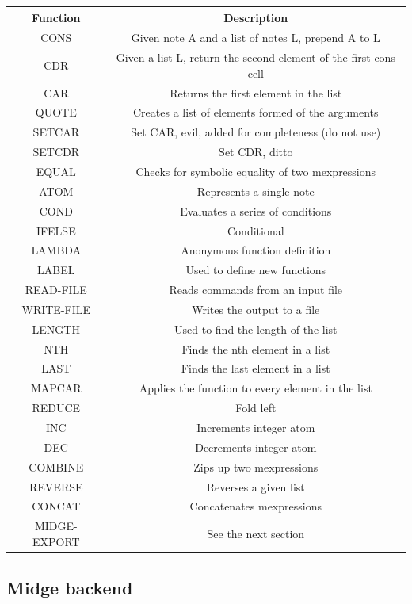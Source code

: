 \documentclass[letterpaper,11pt]{article}
\begin{document}
{\begin{tabular}{|c||c|}
    \hline
    Function & Description\\
    \hline
CONS		 & Given note A and a list of notes L, prepend A to L \\
CDR 	  	 & Given a list L, return the second element of the first cons cell \\
CAR 	  	 & Returns the first element in the list\\
QUOTE  	 & Creates a list of elements formed of the arguments\\
    SETCAR	 & Set CAR, evil, added for completeness (do not use)\\
SETCDR	 & Set CDR, ditto\\
EQUAL  	 & Checks for symbolic equality of two mexpressions\\
ATOM	  	 & Represents a single note\\
COND		 & Evaluates a series of conditions\\
 IFELSE	 & Conditional\\
 LAMBDA	 & Anonymous function definition\\
 LABEL      	 & Used to define new functions \\
 READ-FILE  	 & Reads commands from an input file\\
 WRITE-FILE 	 & Writes the output to a file\\
 LENGTH     	 & Used to find the length of the list\\
 NTH	       	 & Finds the nth element in a list\\
 LAST       	 & Finds the last element in a list\\
 MAPCAR     	 & Applies the function to every element in the list	\\
 REDUCE     	 & Fold left\\
 INC	       	 & Increments integer atom\\
 DEC	       	 & Decrements integer atom\\
 COMBINE    	 & Zips up two mexpressions\\
 REVERSE    	 & Reverses a given list\\
 CONCAT     	 & Concatenates mexpressions\\
 MIDGE-EXPORT & See the next section\\
    \hline
\end{tabular}


\subsection{Midge backend}


}
\end{document}
